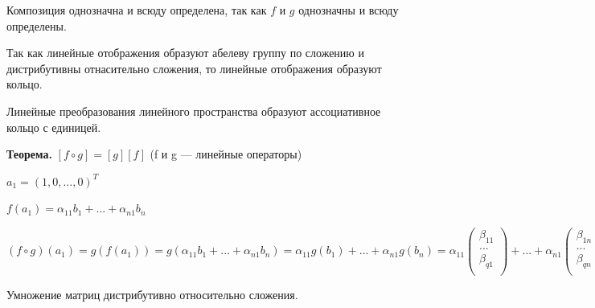 \documentclass[a4paper]{article}
\begin{document}
    Композиция однозначна и всюду определена, так как $f$ и $g$ однозначны и всюду определены.

    Так как линейные отображения образуют абелеву группу по сложению и дистрибутивны отнасительно сложения, то линейные отображения образуют кольцо.

    Линейные преобразования линейного пространства образуют ассоциативное кольцо с единицей.

    \begin{htheorem}
        \textbf{Теорема.} $[f \circ g] = [g][f]$ (f и g --- линейные операторы)
    \end{htheorem}

    \begin{hproof}
        $a_1 = (1,0,...,0)^T$

        $f(a_1) = \alpha_{11}b_1 + ... + \alpha_{n1}b_n$

        $\displaystyle (f \circ g)(a_1) = g(f(a_1)) = g(\alpha_{11}b_1 + ... + \alpha_{n1}b_n) = \alpha_{11}g(b_1) + ... + \alpha_{n1}g(b_n) =
        \alpha_{11} \begin{pmatrix}
                      \beta_{11} \\
                      ...        \\
                      \beta_{q1} \\
        \end{pmatrix} + ... + \alpha_{n1} \begin{pmatrix}
                                              \beta_{1n} \\
                                              ...        \\
                                              \beta_{qn} \\
        \end{pmatrix} = [g] \begin{pmatrix}
                                \alpha_{11} \\
                                ...         \\
                                \alpha_{n1} \\
        \end{pmatrix} = [g(f(a))] = [g][f](a)$


    \end{hproof}

    \begin{htheorem}
        Умножение матриц дистрибутивно относительно сложения.
    \end{htheorem}
\end{document}
